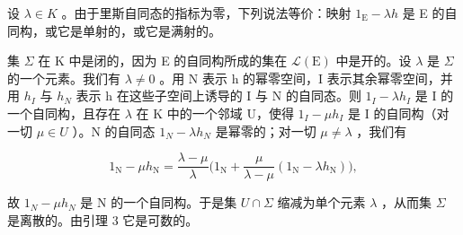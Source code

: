 设 \(\lambda \in K\) 。由于里斯自同态的指标为零，下列说法等价：映射 \(1_{\mathrm{E}} - \lambda h\) 是 E 的自同构，或它是单射的，或它是满射的。

集 \(\Sigma\) 在 K 中是闭的，因为 E 的自同构所成的集在 \(\mathcal{L}(\mathrm{E})\) 中是开的。设 \(\lambda\) 是 \(\Sigma\) 的一个元素。我们有 \(\lambda \neq 0\) 。用 N 表示 h 的幂零空间，I 表示其余幂零空间，并用 \(h_{I}\) 与 \(h_{N}\) 表示 h 在这些子空间上诱导的 I 与 N 的自同态。则 \(1_{I} - \lambda h_{I}\) 是 I 的一个自同构，且存在 \(\lambda\) 在 K 中的一个邻域 U，使得 \(1_{I} - \mu h_{I}\) 是 I 的自同构（对一切 \(\mu \in U\) ）。N 的自同态 \(1_{N} - \lambda h_{N}\) 是幂零的；对一切 \(\mu \neq \lambda\) ，我们有

\[
1 _ {\mathrm{N}} - \mu h _ {\mathrm{N}} = \frac {\lambda - \mu}{\lambda} \Big (1 _ {\mathrm{N}} + \frac {\mu}{\lambda - \mu} (1 _ {\mathrm{N}} - \lambda h _ {\mathrm{N}}) \Big),
\]

故 \(1_{N} - \mu h_{N}\) 是 N 的一个自同构。于是集 \(U \cap \Sigma\) 缩减为单个元素 \(\lambda\) ，从而集 \(\Sigma\) 是离散的。由引理 3 它是可数的。

